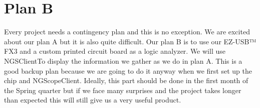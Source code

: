 \section{Plan B}
Every project needs a contingency plan and this is no exception. We are excited about our plan A but it is also quite difficult. Our plan B is to use our EZ-USB™ FX3 and a custom printed circuit board as a logic analyzer. We will use NGSClientTo display the information we gather as we do in plan A. This is a good backup plan because we are going to do it anyway when we first set up the chip and NGScopeClient. Ideally, this part should be done in the first month of the Spring quarter but if we face many surprises and the project takes longer than expected this will still give us a very useful product.
